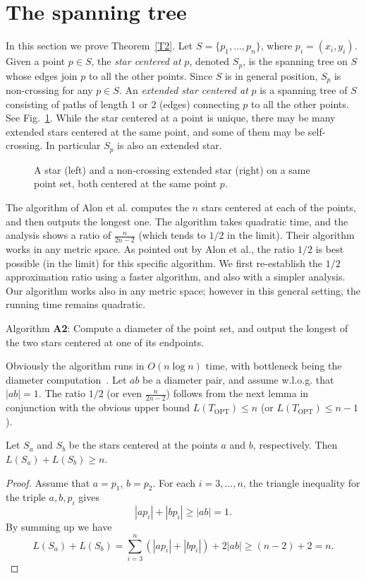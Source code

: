 \documentclass[proceedings]{stacs}
\begin{document}
\section{The spanning tree} \label{sec:tree}

In this section we prove Theorem~\ref{T2}.
Let $S=\{p_1,\ldots,p_n\}$, where $p_i=(x_i,y_i)$.
Given a point $p\in S$, the {\em star centered at} $p$,
denoted $S_p$, is the spanning tree on $S$ whose edges join $p$ to all
the other points. Since $S$ is in general position, $S_p$ is
non-crossing for any $p \in S$.
An {\em extended star centered at} $p$ is a spanning tree of $S$
consisting of paths of length $1$ or $2$ (edges) connecting $p$ to all
the other points.
See Fig.~\ref{f2}. While the star centered at a point is unique, there
may be many extended stars centered at the same point, and some of
them may be self-crossing. In particular $S_p$ is also an extended
star.

\begin{figure} [htbp]
\centerline{\epsfxsize=3.3in }
\caption{\small A star (left) and a non-crossing extended star (right)
on a same point set, both centered at the same point $p$.}
\label{f2}
\end{figure}


The algorithm of Alon et al. computes the $n$ stars centered at each
of the points, and then outputs the longest one. The algorithm takes
quadratic time, and the analysis shows a ratio of $\frac{n}{2n-2}$
(which tends to $1/2$ in the limit). Their algorithm works in any
metric space. As pointed out by Alon et al., the ratio $1/2$ is best
possible (in the limit) for this specific algorithm.
We first re-establish the $1/2$ approximation ratio using a faster
algorithm, and also with a simpler analysis. Our algorithm
works also in any  metric space; however in this general setting, the
running time remains quadratic.


\smallskip
\noindent Algorithm {\bf A2}: Compute a diameter of the point
set, and output the longest of the two stars centered at one of its endpoints.

\smallskip
Obviously the algorithm runs in $O(n \log{n})$ time, with bottleneck
being the diameter computation~\cite{PS85}.
Let $ab$ be a diameter pair, and assume w.l.o.g. that $|ab|=1$.
The ratio $1/2$ (or even $\frac{n}{2n-2}$)
follows from the next lemma in conjunction with the obvious upper
bound $L(T_\textrm{OPT}) \leq n$ (or $L(T_\textrm{OPT}) \leq n-1$).

\begin{lemma} \label{L3}
Let $S_a$ and  $S_b$ be the stars centered at the points $a$ and $b$,
respectively. Then $ L(S_a) + L(S_b) \geq n$.
\end{lemma}
\begin{proof}
Assume that $a=p_1$, $b=p_2$. For each $i=3,\ldots,n$, the triangle inequality
for the triple $a,b,p_i$ gives
$$ |ap_i| + |b p_i| \geq |ab|=1. $$
By summing up we have
\[ L(S_a) + L(S_b)= \sum_{i=3}^n (|ap_i| + |b p_i|) + 2|ab|
\geq (n-2)+2=n. \]

\vspace{-1.5\baselineskip}
\end{proof}
\end{document}
